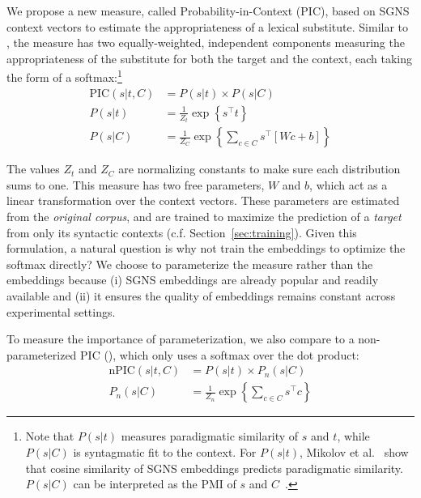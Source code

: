 \documentclass[12pt]{article}
\begin{document}
We propose a new measure, called Probability-in-Context (PIC), based
on SGNS context vectors to estimate the appropriateness
of a lexical substitute. Similar to \balAddCos, the measure has two equally-weighted,
independent components measuring the appropriateness of the substitute
for both the target and the context, each taking the form of a softmax:\footnote{Note that $P(s|t)$ measures paradigmatic similarity
  of $s$ and $t$, while $P(s|C)$ is syntagmatic fit to the
  context.
  For $P(s|t)$,
  Mikolov et al.~ show that cosine
  similarity of SGNS embeddings predicts
  paradigmatic similarity. $P(s|C)$ can be interpreted as the PMI of
  $s$ and $C$~\cite{levy:2014:nips}.}
\begin{equation}
  \begin{aligned}
  \mbox{PIC}(s | t, C) &= P(s | t) \times P(s | C)\\
  P(s | t) &= \frac{1}{Z_t}\exp\left\{s^\top t\right\}\\ %
  P(s | C) &= \frac{1}{Z_C}\exp\left\{\sum_{c\in C}s^\top\left[Wc + b\right]\right\}
  \end{aligned}
  \label{eqn:pic}
\end{equation}

The values $Z_t$ and $Z_C$ are normalizing constants to make sure each
distribution sums to one. This measure has two free parameters, $W$ and $b$,
which act as a linear transformation over the context vectors. These parameters
are estimated from the {\em original corpus}, and are trained to maximize
the prediction of a {\em target} from only its syntactic contexts (c.f. Section~\ref{sec:training}).
Given this formulation, a natural question is why not train the embeddings to optimize the
softmax directly? We choose to parameterize the measure rather than the
embeddings because (i) SGNS embeddings are already popular and readily
available and
(ii) it ensures the quality of embeddings remains constant across experimental 
settings.

To measure the importance of parameterization, we
also compare to a non-parameterized PIC (\ourmeas), which only uses a softmax over the
dot product:
\begin{equation}
  \begin{aligned}
  \mbox{nPIC}(s | t, C) &= P(s | t) \times P_n(s | C)\\
  P_n(s | C) &= \frac{1}{Z_n}\exp\left\{\sum_{c\in C}s^\top c\right\} %
  \end{aligned}
  \label{eqn:npic}
\end{equation}
\end{document}
